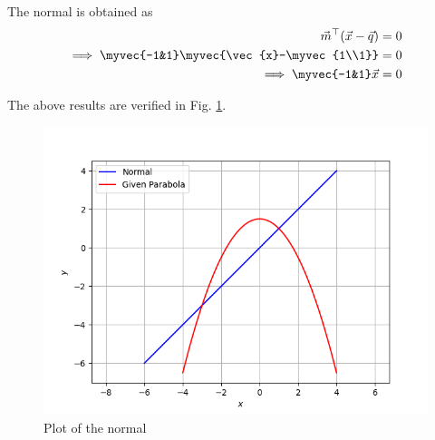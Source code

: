The normal is obtained as 
\begin{align}
    \vec{m}^\top (\vec{x}-\vec{q}) &= 0\\
    \implies \myvec{-1&1}\myvec{\vec{x}-\myvec{1\\1}} &= 0\\
    \implies \myvec{-1&1}\vec{x} &= 0
\end{align}

The above results are verified in Fig. \ref{sep/2/68/plot}. 
\begin{figure}
    \centering
    \includegraphics[width=\columnwidth]{solutions/sep/2/68/figures/figure.png}
    \caption{Plot of the normal}
    \label{sep/2/68/plot}
\end{figure}

